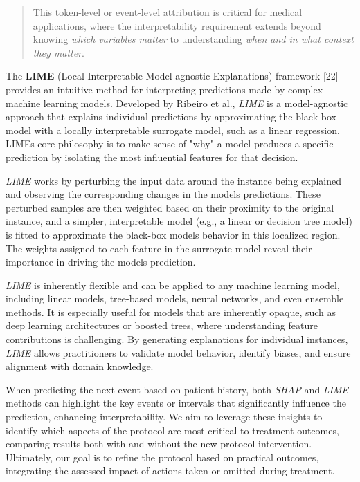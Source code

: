 \documentclass[
]{article}
\begin{document}
\begin{quote}
This token-level or event-level attribution is critical for medical
applications, where the interpretability requirement extends beyond
knowing \emph{which variables matter} to understanding \emph{when and in
what context they matter}.
\end{quote}

The \textbf{LIME} (Local Interpretable Model-agnostic Explanations)
framework {[}22{]} provides an intuitive method for interpreting
predictions made by complex machine learning models. Developed by
Ribeiro et al., \emph{LIME} is a model-agnostic approach that explains
individual predictions by approximating the black-box model with a
locally interpretable surrogate model, such as a linear regression.
LIME\textquotesingle s core philosophy is to make sense of "why" a model
produces a specific prediction by isolating the most influential
features for that decision.

\emph{LIME} works by perturbing the input data around the instance being
explained and observing the corresponding changes in the
model\textquotesingle s predictions. These perturbed samples are then
weighted based on their proximity to the original instance, and a
simpler, interpretable model (e.g., a linear or decision tree model) is
fitted to approximate the black-box model\textquotesingle s behavior in
this localized region. The weights assigned to each feature in the
surrogate model reveal their importance in driving the
model\textquotesingle s prediction.

\emph{LIME} is inherently flexible and can be applied to any machine
learning model, including linear models, tree-based models, neural
networks, and even ensemble methods. It is especially useful for models
that are inherently opaque, such as deep learning architectures or
boosted trees, where understanding feature contributions is challenging.
By generating explanations for individual instances, \emph{LIME} allows
practitioners to validate model behavior, identify biases, and ensure
alignment with domain knowledge.

When predicting the next event based on patient history, both
\emph{SHAP} and \emph{LIME} methods can highlight the key events or
intervals that significantly influence the prediction, enhancing
interpretability. We aim to leverage these insights to identify which
aspects of the protocol are most critical to treatment outcomes,
comparing results both with and without the new protocol intervention.
Ultimately, our goal is to refine the protocol based on practical
outcomes, integrating the assessed impact of actions taken or omitted
during treatment.
\end{document}
